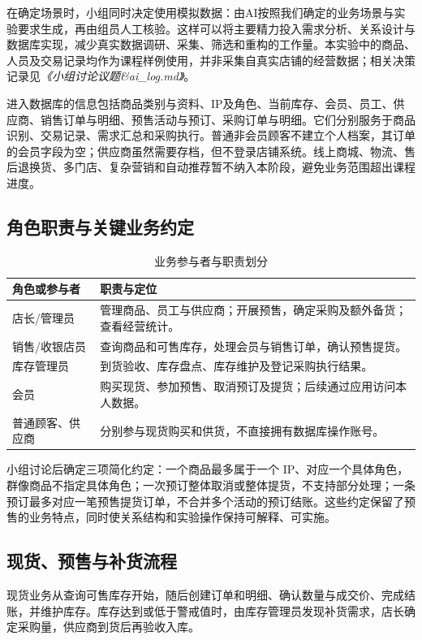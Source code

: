 \documentclass{SYSUReport}
\newcommand{\docref}[1]{\textit{《#1》}}
\begin{document}
在确定场景时，小组同时决定使用模拟数据：由AI按照我们确定的业务场景与实验要求生成，再由组员人工核验。这样可以将主要精力投入需求分析、关系设计与数据库实现，减少真实数据调研、采集、筛选和重构的工作量。本实验中的商品、人员及交易记录均作为课程样例使用，并非采集自真实店铺的经营数据；相关决策记录见\docref{小组讨论议题\&ai\_log.md}。

进入数据库的信息包括商品类别与资料、IP及角色、当前库存、会员、员工、供应商、销售订单与明细、预售活动与预订、采购订单与明细。它们分别服务于商品识别、交易记录、需求汇总和采购执行。普通非会员顾客不建立个人档案，其订单的会员字段为空；供应商虽然需要存档，但不登录店铺系统。线上商城、物流、售后退换货、多门店、复杂营销和自动推荐暂不纳入本阶段，避免业务范围超出课程进度。

\subsection{角色职责与关键业务约定}
\begin{table}[htbp]
\centering\small
\begin{tabularx}{\textwidth}{P{2.4cm}Y}
\toprule 角色或参与者 & 职责与定位 \\
\midrule
店长/管理员 & 管理商品、员工与供应商；开展预售，确定采购及额外备货；查看经营统计。\\
销售/收银店员 & 查询商品和可售库存，处理会员与销售订单，确认预售提货。\\
库存管理员 & 到货验收、库存盘点、库存维护及登记采购执行结果。\\
会员 & 购买现货、参加预售、取消预订及提货；后续通过应用访问本人数据。\\
普通顾客、供应商 & 分别参与现货购买和供货，不直接拥有数据库操作账号。\\
\bottomrule
\end{tabularx}
\caption{业务参与者与职责划分}
\end{table}

小组讨论后确定三项简化约定：一个商品最多属于一个 IP、对应一个具体角色，群像商品不指定具体角色；一次预订整体取消或整体提货，不支持部分处理；一条预订最多对应一笔预售提货订单，不合并多个活动的预订结账。这些约定保留了预售的业务特点，同时使关系结构和实验操作保持可解释、可实施。

\subsection{现货、预售与补货流程}
现货业务从查询可售库存开始，随后创建订单和明细、确认数量与成交价、完成结账，并维护库存。库存达到或低于警戒值时，由库存管理员发现补货需求，店长确定采购量，供应商到货后再验收入库。
\end{document}
